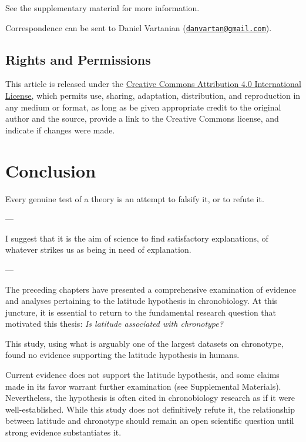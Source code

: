 \documentclass[
12pt,
openright,
oneside,
a4paper,
chapter=TITLE,
section=TITLE,
french,
spanish,
brazil,
english
]{abntex2}
\begin{document}
See the supplementary material for more information.

Correspondence can be sent to Daniel Vartanian
(\href{mailto:danvartan@gmail.com}{\nolinkurl{danvartan@gmail.com}}).

\section{Rights and Permissions}\label{rights-and-permissions}

This article is released under the
\href{http://creativecommons.org/licenses/by/4.0/}{Creative Commons
Attribution 4.0 International License}, which permits use, sharing,
adaptation, distribution, and reproduction in any medium or format, as
long as be given appropriate credit to the original author and the
source, provide a link to the Creative Commons license, and indicate if
changes were made.


\chapter{Conclusion}\label{sec-conclusion}

\epigraph{Every genuine test of a theory is an attempt to falsify it, or to refute it.}{--- \textcite{popper2002}}
\vspace*{-1\baselineskip}
\epigraph{I suggest that it is the aim of science to find satisfactory explanations, of whatever strikes us as being in need of explanation.}{--- \textcite[193]{popper1979a}}

The preceding chapters have presented a comprehensive examination of
evidence and analyses pertaining to the latitude hypothesis in
chronobiology. At this juncture, it is essential to return to the
fundamental research question that motivated this thesis: \emph{Is
latitude associated with chronotype?}

This study, using what is arguably one of the largest datasets on
chronotype, found no evidence supporting the latitude hypothesis in
humans.

Current evidence does not support the latitude hypothesis, and some
claims made in its favor warrant further examination (see Supplemental
Materials). Nevertheless, the hypothesis is often cited in chronobiology
research as if it were well-established. While this study does not
definitively refute it, the relationship between latitude and chronotype
should remain an open scientific question until strong evidence
substantiates it.
\end{document}

